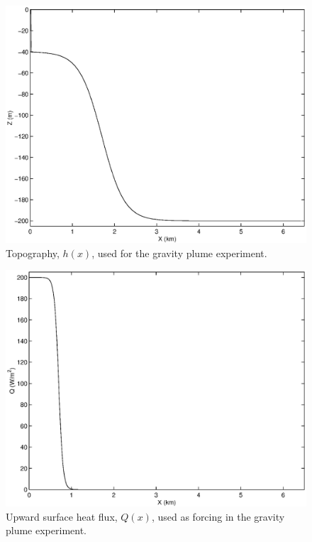 \begin{figure}
\begin{center}
\includegraphics[width=\textwidth,height=.3\textheight]{s_examples/plume_on_slope/Depth.eps}
\end{center}
\caption{Topography, $h(x)$, used for the gravity plume experiment.}
\label{fig:depth-plume-on-slope}
\end{figure}

\begin{figure}
\begin{center}
\includegraphics[width=\textwidth,height=.3\textheight]{s_examples/plume_on_slope/Qsurf.eps}
\end{center}
\caption{Upward surface heat flux, $Q(x)$, used as forcing in the
gravity plume experiment.}
\label{fig:Q-plume-on-slope}
\end{figure}

